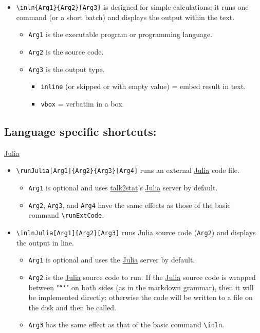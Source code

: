 \documentclass{ltxdoc}
\begin{document}
\begin{itemize}
\item \texttt{\textbackslash{}inln\{Arg1\}\{Arg2\}[Arg3]} is designed for simple calculations; it runs
one command (or a short batch) and displays the output within the
text.

\begin{itemize}
\item \texttt{Arg1} is the executable program or programming language.
\item \texttt{Arg2} is the source code.
\item \texttt{Arg3} is the output type.
\begin{itemize}
\item \texttt{inline} (or skipped or with empty value) = embed result in text.
\item \texttt{vbox} = verbatim in a box.
\end{itemize}
\end{itemize}
\end{itemize}

\subsection{Language specific shortcuts:}
\label{sec:org154f922}
\href{https://julialang.org/}{Julia}

\begin{itemize}
\item \texttt{\textbackslash{}runJulia[Arg1]\{Arg2\}\{Arg3\}[Arg4]} runs an external
\href{https://julialang.org/}{Julia} code file.
\begin{itemize}
\item \texttt{Arg1} is optional and uses
\href{https://pypi.org/project/talk2stat/}{talk2stat}'s
\href{https://julialang.org/}{Julia} server by default.
\item \texttt{Arg2}, \texttt{Arg3}, and \texttt{Arg4} have the same effects as those of the
basic command \texttt{\textbackslash{}runExtCode}.
\end{itemize}
\item \texttt{\textbackslash{}inlnJulia[Arg1]\{Arg2\}[Arg3]} runs \href{https://julialang.org/}{Julia}
source code (\texttt{Arg2}) and displays the output in line.
\begin{itemize}
\item \texttt{Arg1} is optional and uses the \href{https://julialang.org/}{Julia}
server by default.
\item \texttt{Arg2} is the \href{https://julialang.org/}{Julia} source code to run.
If the \href{https://julialang.org/}{Julia} source code is wrapped
between "\texttt{```}" on both sides (as in the markdown grammar), then it
will be implemented directly; otherwise the code will be written to
a file on the disk and then be called.
\item \texttt{Arg3} has the same effect as that of the basic command \texttt{\textbackslash{}inln}.
\end{itemize}
\end{itemize}
\end{document}
